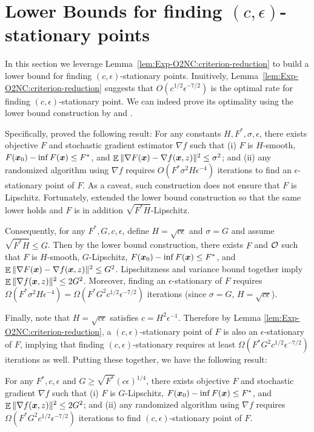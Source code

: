 \section{Lower Bounds for finding $(c,\epsilon)$-stationary points}
\label{sec:Exp-O2NC_lower}

In this section we leverage Lemma~\ref{lem:Exp-O2NC:criterion-reduction} to build a lower bound for finding  $(c,\epsilon)$-stationary points. Inuitively, Lemma~\ref{lem:Exp-O2NC:criterion-reduction} suggests that $O(c^{1/2}\epsilon^{-7/2})$ is the optimal rate for finding $(c,\epsilon)$-stationary point. We can indeed prove its optimality using the lower bound construction by \citet{arjevani2019lower} and \citet{cutkosky2023optimal}.

Specifically, \citet{arjevani2019lower} proved the following result: For any constants $H,F^*,\sigma,\epsilon$, there exists objective $F$ and stochastic gradient estimator $\nabla f$ such that (i) $F$ is $H$-smooth, $F({\boldsymbol{x}}_0)-\inf F({\boldsymbol{x}}) \le F^*$, and $\mathop{\mathbb{E}}\|\nabla F({\boldsymbol{x}}) - \nabla f({\boldsymbol{x}},z)\|^2 \le\sigma^2$; and (ii) any randomized algorithm using $\nabla f$ requires $O(F^*\sigma^2H\epsilon^{-4})$ iterations to find an $\epsilon$-stationary point of $F$.
As a caveat, such construction does not ensure that $F$ is Lipschitz. Fortunately, \citet{cutkosky2023optimal} extended the lower bound construction so that the same lower holds and $F$ is in addition $\sqrt{F^*H}$-Lipschitz.

Consequently, for any $F^*,G,c,\epsilon$, define $H=\sqrt{c\epsilon}$ and $\sigma=G$ and assume $\sqrt{F^*H}\le G$. Then by the lower bound construction, there exists $F$ and ${\cal O}$ such that $F$ is $H$-smooth, $G$-Lipschitz, $F({\boldsymbol{x}}_0)-\inf F({\boldsymbol{x}}) \le F^*$, and $\mathop{\mathbb{E}}\|\nabla F({\boldsymbol{x}})-\nabla f({\boldsymbol{x}},z)\|^2 \le G^2$. Lipschitzness and variance bound together imply $\mathop{\mathbb{E}}\|\nabla f({\boldsymbol{x}},z)\|^2 \le 2G^2$. Moreover, finding an $\epsilon$-stationary of $F$ requires $\Omega(F^*\sigma^2H\epsilon^{-4}) = \Omega(F^*G^2c^{1/2}\epsilon^{-7/2})$ iterations (since $\sigma=G$, $H=\sqrt{c\epsilon}$). 

Finally, note that $H=\sqrt{c\epsilon}$ satisfies $c=H^2\epsilon^{-1}$. Therefore by Lemma \ref{lem:Exp-O2NC:criterion-reduction}, a $(c, \epsilon)$-stationary point of $F$ is also an $\epsilon$-stationary of $F$, implying that finding $(c,\epsilon)$-stationary requires at least $\Omega(F^*G^2c^{1/2}\epsilon^{-7/2})$ iterations as well. Putting these together, we have the following result:

\begin{corollary}
\label{cor:Exp-O2NC:lower-bound}
For any $F^*, c, \epsilon$ and $G\ge \sqrt{F^*}(c\epsilon)^{1/4}$, there exists objective $F$ and stochastic gradient $\nabla f$ such that (i) $F$ is $G$-Lipschitz, $F({\boldsymbol{x}}_0)-\inf F({\boldsymbol{x}}) \le F^*$, and $\mathop{\mathbb{E}}\|\nabla f({\boldsymbol{x}},z)\|^2 \le 2G^2$; and (ii) any randomized algorithm using $\nabla f$ requires $\Omega(F^*G^2c^{1/2}\epsilon^{-7/2})$ iterations to find $(c,\epsilon)$-stationary point of $F$.
\end{corollary}